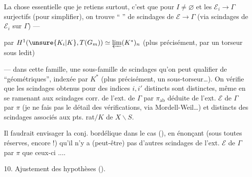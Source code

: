La chose essentielle que je retiens surtout, c'est que pour $I\ne\varnothing$ et les $\mathcal{E}_i\to\Gamma$ surjectifs (pour simplifier), on trouve   `` '' de scindages de $\mathcal{E}\to\Gamma$ (via scindages de $\mathcal{E}_i$ sur $\Gamma$) ---  


par $H^1(\unsure{K_i|K},T(G_m))\simeq\varprojlim(K^*)_n$ (plus précisément, par un torseur sous ledit)

--- dans cette famille, une sous-famille de scindages qu'on peut qualifier de ``géométriques'', indexée par $K^*$ (plus précisément, un sous-torseur\ldots).
On vérifie que les scindages obtenus pour des indices $i,i'$ distincts sont distinctes, même en se ramenant aux \unsure{$\pi$-}scindages corr. de l'ext. de $\Gamma$ par $\pi_{\mathrm{ab}}$ déduite de l'ext. $\mathcal{E}$ de $\Gamma$ par $\pi$ (je ne fais pas le détail des vérifications, via Mordell-Weil\ldots) et distincts des scindages associés aux pts. rat$/K$ de $X\backslash S$.

Il faudrait envisager la conj. bordélique dans le cas (\uline{}), en énonçant (sous toutes réserves, encore !) qu'il n'y a (peut-être) pas d'autres scindages de l'ext. $\mathcal{E}$ de $\Gamma$ par $\pi$ que ceux-ci ....


10. Ajustement des hypothèses ().

